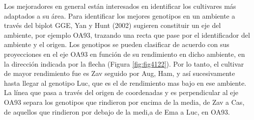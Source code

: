 Los mejoradores en general están interesados en identificar los cultivares más adaptados a su área. Para identificar los mejores genotipos en un ambiente a través del biplot GGE, Yan y Hunt (2002) sugieren constituir un eje del ambiente, por ejemplo OA93, trazando una recta que pase por el identificador del ambiente y el origen. Los genotipos se pueden clasificar de acuerdo con sus proyecciones en el eje OA93 en función de su rendimiento en dicho ambiente, en la dirección indicada por la flecha (Figura \ref{fig:fig4122}). Por lo tanto, el cultivar de mayor rendimiento fue es Zav seguido por Aug, Ham, y así sucesivamente hasta llegar al genotipo Luc, que es el de rendimiento mas bajo en ese ambiente. La línea que pasa a través del origen de coordenadas y es perpendicular al eje OA93 separa los genotipos que rindieron por encima de la media, de Zav a Cas, de aquellos que rindieron por debajo de la medi,a de Ema a Luc, en OA93.


